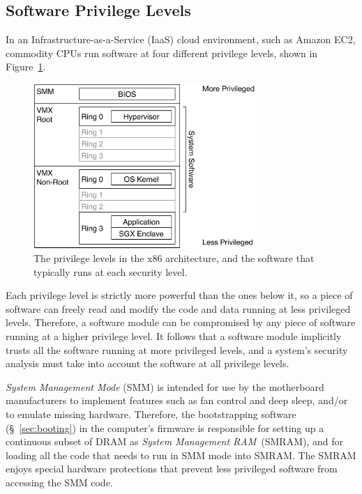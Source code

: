 \subsection{Software Privilege Levels}
\label{sec:rings}


In an Infrastructure-as-a-Service (IaaS) cloud environment, such as Amazon EC2,
commodity CPUs run software at four different privilege levels, shown in
Figure~\ref{fig:cpu_rings}.

\begin{figure}[hbtp]
  \centering
  \includegraphics[width=85mm]{figures/cpu_rings.pdf}
  \caption{
    The privilege levels in the x86 architecture, and the software that
    typically runs at each security level.
  }
  \label{fig:cpu_rings}
\end{figure}

Each privilege level is strictly more powerful than the ones below it, so a
piece of software can freely read and modify the code and data running at less
privileged levels. Therefore, a software module can be compromised by any piece
of software running at a higher privilege level. It follows that a software
module implicitly trusts all the software running at more privileged levels,
and a system's security analysis must take into account the software at all
privilege levels.


\textit{System Management Mode} (SMM) is intended for use by the motherboard
manufacturers to implement features such as fan control and deep sleep, and/or
to emulate missing hardware. Therefore, the bootstrapping software
(\S~\ref{sec:booting}) in the computer's firmware is responsible for setting up
a continuous subset of DRAM as \textit{System Management RAM}~(SMRAM), and for
loading all the code that needs to run in SMM mode into SMRAM. The SMRAM
enjoys special hardware protections that prevent less privileged software from
accessing the SMM code.

